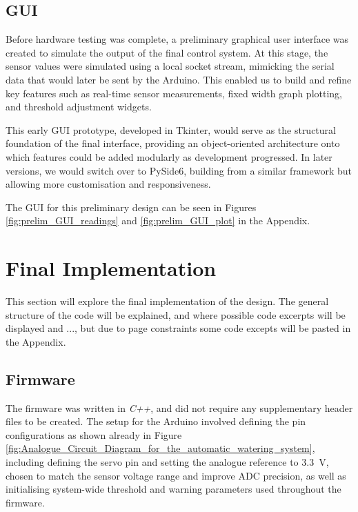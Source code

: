 \documentclass[a4paper,11pt]{article}
\begin{document}
\subsection{GUI}
\label{sec:gui_simulation}

Before hardware testing was complete, a preliminary graphical user interface was created 
to simulate the output of the final control system. 
At this stage, the sensor values were simulated using a local socket stream, mimicking 
the serial data that would later be sent by the Arduino. This enabled us to build and 
refine key features such as real-time sensor measurements,
fixed width graph plotting, and threshold adjustment widgets.

This early GUI prototype, developed in Tkinter, would serve as the structural 
foundation of the final interface, providing an object-oriented architecture 
onto which features could be added modularly as development progressed.
In later versions, we would switch over to PySide6,
building from a similar framework but allowing 
more customisation and responsiveness.

The GUI for this preliminary design can be seen in 
Figures \ref{fig:prelim_GUI_readings} and \ref{fig:prelim_GUI_plot} in the Appendix.

\section{Final Implementation}
\label{sec:final_implementation}

This section will explore the final implementation of the design.
The general structure of the code will be explained, 
and where possible code excerpts will be displayed and ...,
but due to page constraints some code excepts will be pasted in the Appendix.

\subsection{Firmware}
\label{sec:firmware}

The firmware was written in \textit{C++}, and did not require any supplementary 
header files to be created.
The setup for the Arduino involved defining the pin configurations
as shown already in 
Figure \ref{fig:Analogue_Circuit_Diagram_for_the_automatic_watering_system},
including defining the servo pin and 
setting the analogue reference to \SI{3.3}{\volt}, 
chosen to match the sensor voltage range and improve ADC precision, 
as well as initialising system-wide threshold and 
warning parameters used throughout the firmware.
\end{document}
